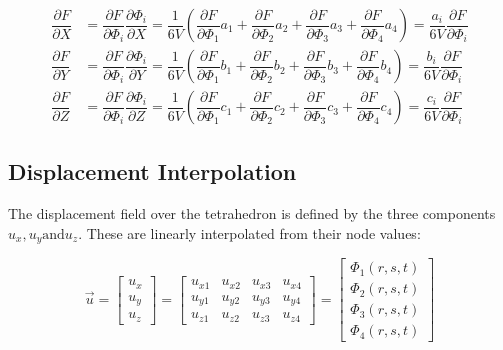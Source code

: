 \begin{equation}\label{eq: tet4_partial differential rules}
\begin{split}
\dfrac{\partial F}{\partial X} &= \dfrac{\partial F}{\partial \Phi_i} \dfrac{\partial \Phi_i}{\partial X} = \dfrac{1}{6V} \left( \dfrac{\partial F}{\partial \Phi_1} a_1 + \dfrac{\partial F}{\partial \Phi_2} a_2 + \dfrac{\partial F}{\partial \Phi_3} a_3 + \dfrac{\partial F}{\partial \Phi_4} a_4\right) = \dfrac{a_i}{6V} \dfrac{\partial F}{\partial \Phi_i} \\
\dfrac{\partial F}{\partial Y} &= \dfrac{\partial F}{\partial \Phi_i} \dfrac{\partial \Phi_i}{\partial Y} = \dfrac{1}{6V} \left( \dfrac{\partial F}{\partial \Phi_1} b_1 + \dfrac{\partial F}{\partial \Phi_2} b_2 + \dfrac{\partial F}{\partial \Phi_3} b_3 + \dfrac{\partial F}{\partial \Phi_4} b_4\right) = \dfrac{b_i}{6V} \dfrac{\partial F}{\partial \Phi_i} \\
\dfrac{\partial F}{\partial Z} &= \dfrac{\partial F}{\partial \Phi_i} \dfrac{\partial \Phi_i}{\partial Z} = \dfrac{1}{6V} \left( \dfrac{\partial F}{\partial \Phi_1} c_1 + \dfrac{\partial F}{\partial \Phi_2} c_2 + \dfrac{\partial F}{\partial \Phi_3} c_3 + \dfrac{\partial F}{\partial \Phi_4} c_4\right) = \dfrac{c_i}{6V} \dfrac{\partial F}{\partial \Phi_i}
\end{split}
\end{equation}

\subsection{Displacement Interpolation}
The displacement field over the tetrahedron is defined by the three components $ u_x, u_y \mathrm{and} u_z $. These are linearly interpolated from their node values:

\begin{equation} \label{eq: tet4_displacement interpolation}
\vec{u} = \begin{bmatrix}
u_x\\
u_y\\
u_z
\end{bmatrix} = \begin{bmatrix}
u_{x1} & u_{x2} & u_{x3} & u_{x4}\\
u_{y1} & u_{y2} & u_{y3} & u_{y4}\\
u_{z1} & u_{z2} & u_{z3} & u_{z4}
\end{bmatrix} = \begin{bmatrix}
\Phi_1(r,s,t)\\
\Phi_2(r,s,t)\\
\Phi_3(r,s,t)\\
\Phi_4(r,s,t)
\end{bmatrix}
\end{equation}

